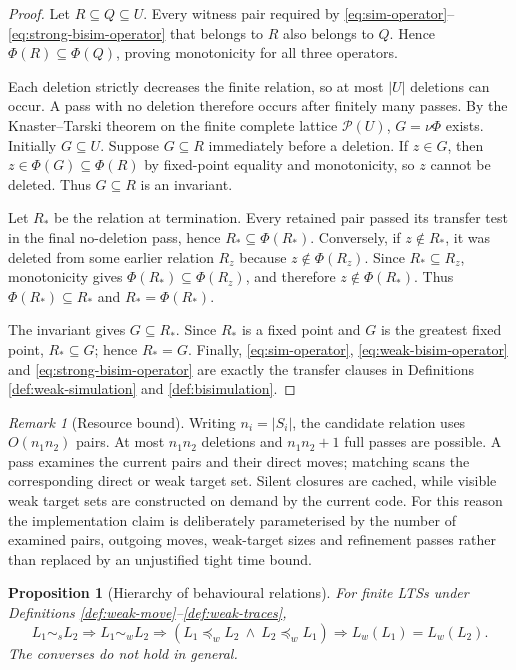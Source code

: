 \documentclass[JMCS,submit]{resources/ISRP}
\newtheorem{proposition}[theorem]{Proposition}
\theoremstyle{definition}
\theoremstyle{remark}
\newtheorem{remark}[theorem]{Remark}
\numberwithin{equation}{section}
\newcommand{\powerset}{\mathcal{P}}
\newcommand{\strongsim}{\mathrel{\sim_{s}}}
\newcommand{\weaksim}{\mathrel{\sim_{w}}}
\newcommand{\weakpre}{\mathrel{\preceq_{w}}}
\begin{document}
\begin{proof}
Let $R\subseteq Q\subseteq U$. Every witness pair required by
\eqref{eq:sim-operator}--\eqref{eq:strong-bisim-operator} that belongs to $R$
also belongs to $Q$. Hence $\Phi(R)\subseteq\Phi(Q)$, proving monotonicity for
all three operators.

Each deletion strictly decreases the finite relation, so at most $|U|$ deletions
can occur. A pass with no deletion therefore occurs after finitely many passes.
By the Knaster--Tarski theorem on the finite complete lattice $\powerset(U)$,
$G=\nu\Phi$ exists. Initially $G\subseteq U$. Suppose $G\subseteq R$ immediately
before a deletion. If $z\in G$, then
$z\in\Phi(G)\subseteq\Phi(R)$ by fixed-point equality and monotonicity, so $z$
cannot be deleted. Thus $G\subseteq R$ is an invariant.

Let $R_*$ be the relation at termination. Every retained pair passed its transfer
test in the final no-deletion pass, hence $R_*\subseteq\Phi(R_*)$. Conversely,
if $z\notin R_*$, it was deleted from some earlier relation $R_z$ because
$z\notin\Phi(R_z)$. Since $R_*\subseteq R_z$, monotonicity gives
$\Phi(R_*)\subseteq\Phi(R_z)$, and therefore $z\notin\Phi(R_*)$. Thus
$\Phi(R_*)\subseteq R_*$ and $R_*=\Phi(R_*)$.

The invariant gives $G\subseteq R_*$. Since $R_*$ is a fixed point and $G$ is
the greatest fixed point, $R_*\subseteq G$; hence $R_*=G$. Finally,
\eqref{eq:sim-operator}, \eqref{eq:weak-bisim-operator} and
\eqref{eq:strong-bisim-operator} are exactly the transfer clauses in Definitions
\ref{def:weak-simulation} and \ref{def:bisimulation}.
\end{proof}

\begin{remark}[Resource bound]\label{rem:complexity}
Writing $n_i=|S_i|$, the candidate relation uses $O(n_1n_2)$ pairs. At most
$n_1n_2$ deletions and $n_1n_2+1$ full passes are possible. A pass examines the
current pairs and their direct moves; matching scans the corresponding direct or
weak target set. Silent closures are cached, while visible weak target sets are
constructed on demand by the current code. For this reason the implementation
claim is deliberately parameterised by the number of examined pairs, outgoing
moves, weak-target sizes and refinement passes rather than replaced by an
unjustified tight time bound.
\end{remark}

\begin{proposition}[Hierarchy of behavioural relations]\label{prop:hierarchy}
For finite LTSs under Definitions \ref{def:weak-move}--\ref{def:weak-traces},
\begin{equation}\label{eq:hierarchy}
L_1\strongsim L_2
\Longrightarrow L_1\weaksim L_2
\Longrightarrow
(L_1\weakpre L_2\ \land\ L_2\weakpre L_1)
\Longrightarrow L_w(L_1)=L_w(L_2).
\end{equation}
The converses do not hold in general.
\end{proposition}
\end{document}
